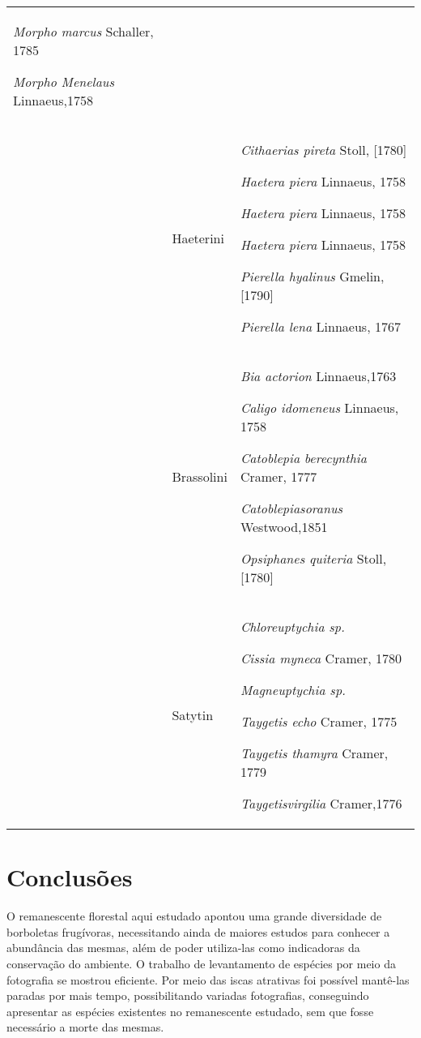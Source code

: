 \documentclass[article,12pt,onesidea,4paper,english,brazil]{abntex2}
\begin{document}
\begin{longtable}{p{.2\linewidth}p{.2\linewidth}p{.5\linewidth}}
			\textit{Morpho marcus }Schaller, 1785
			
			\textit{Morpho Menelaus }Linnaeus,1758
		\\  
		 &
			Haeterini &
			
			\textit{Cithaerias pireta }Stoll, [1780]  			
			
			\textit{Haetera piera }Linnaeus, 1758  			
			
			\textit{Haetera piera }Linnaeus, 1758  			
			
			\textit{Haetera piera }Linnaeus, 1758
			
			\textit{Pierella hyalinus} Gmelin, [1790]  			
			
			\textit{Pierella lena} Linnaeus, 1767  			
		\\  
		 &
		Brassolini &
		
			
			\textit{Bia actorion} Linnaeus,1763  			
			
			\textit{Caligo idomeneus} Linnaeus, 1758  			
			
			\textit{Catoblepia berecynthia} Cramer, 1777  			
			
			\textit{Catoblepiasoranus} Westwood,1851  			
			
			\textit{Opsiphanes quiteria} Stoll,[1780]
		\\  
		 &
		Satytin &
		\textit{Chloreuptychia sp.}  			
			
			\textit{Cissia myneca} Cramer, 1780  			
			
			\textit{Magneuptychia sp.}  			
			
			\textit{Taygetis echo }Cramer, 1775  			
			
			\textit{Taygetis thamyra} Cramer, 1779  			
			
			\textit{Taygetisvirgilia} Cramer,1776
		\\  
		\hline
	\end{longtable}
	
	\section*{Conclusões}
	
	O remanescente florestal aqui estudado apontou uma grande diversidade de borboletas frugívoras, necessitando ainda de maiores estudos para conhecer a abundância das mesmas, além de poder utiliza-las como indicadoras da conservação do ambiente. O trabalho de levantamento de espécies por meio da fotografia se mostrou eficiente. Por meio das iscas atrativas foi possível mantê-las paradas por mais tempo, possibilitando variadas fotografias, conseguindo apresentar as espécies existentes no remanescente estudado, sem que fosse necessário a morte das mesmas.
	
\end{document}
